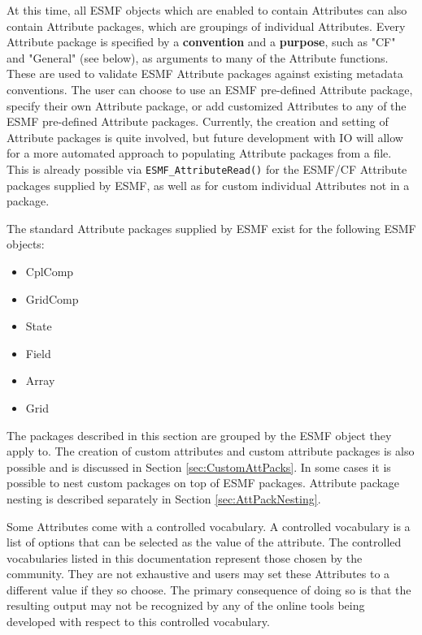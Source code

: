 %


\label{sec:AttPacks}

At this time, all ESMF objects which are enabled to contain Attributes can also contain Attribute packages, which are groupings of individual Attributes.  Every Attribute package is specified by a {\bf convention} and a {\bf purpose}, such as "CF" and "General" (see below), as arguments to many of the Attribute functions.  These are used to validate ESMF Attribute packages against existing metadata conventions.  The user can choose to use an ESMF pre-defined Attribute package, specify their own Attribute package, or add customized Attributes to any of the ESMF pre-defined Attribute packages. Currently, the creation and setting of Attribute packages is quite involved, but future development with IO will allow for a more automated approach to populating Attribute packages from a file.  This is already possible via {\tt ESMF\_AttributeRead()} for the ESMF/CF Attribute packages supplied by ESMF, as well as for custom individual Attributes not in a package.

The standard Attribute packages supplied by ESMF exist for the following ESMF objects:

\begin{itemize}
    \item CplComp
    \item GridComp
    \item State
    \item Field
    \item Array
    \item Grid
\end{itemize}

The packages described in this section are grouped by the ESMF object they apply to. The creation of custom attributes and custom attribute packages is also possible and is discussed in Section \ref{sec:CustomAttPacks}. In some cases it is possible to nest custom packages on top of ESMF packages. Attribute package nesting is described separately in Section \ref{sec:AttPackNesting}.

Some Attributes come with a controlled vocabulary. A controlled vocabulary is a list of options that can be selected as the value of the attribute. The controlled vocabularies listed in this documentation represent those chosen by the community. They are not exhaustive and users may set these Attributes to a different value if they so choose. The primary consequence of doing so is that the resulting output may not be recognized by any of the online tools being developed with respect to this controlled vocabulary.  


